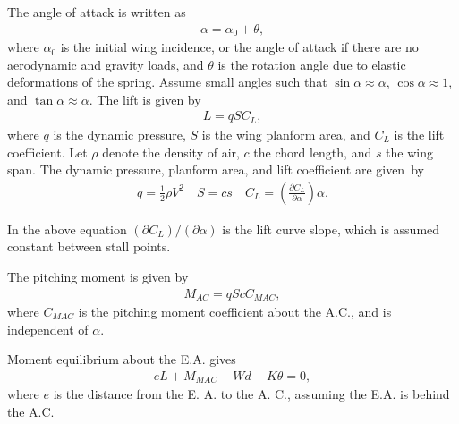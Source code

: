 \documentclass{AeroStructure-ERJohnson}
\begin{document}
The angle of attack is written\vspace*{-4pt} as
\begin{align}\label{eq12.1}
\alpha=\alpha_{0}+\theta,
\end{align}
where $\alpha_{0}$ is the initial wing incidence, or the angle of attack if there are no aerodynamic and gravity loads, and $\theta$ is the rotation angle due to elastic deformations of the spring. Assume small angles such that $\sin \alpha \approx \alpha$, $\cos \alpha \approx 1$, and $\tan \alpha \approx \alpha$. The lift is given\vspace*{-4pt} by
\begin{align}\label{eq12.2}
L=q S C_{L},
\end{align}
where $q$ is the dynamic pressure, $S$ is the wing planform area, and $C_{L}$ is the lift coefficient. Let $\rho$ denote the density of air, ${c}$ the chord length, and $s$ the wing span. The dynamic pressure, planform area, and lift coefficient are given~\vspace*{-4pt}by
\begin{align}\label{eq12.3}
q=\frac{1}{2} \rho V^{2} \quad S=c s \quad C_{L}=\left(\frac{\partial C_{L}}{\partial \alpha}\right) \alpha.
\end{align}
\vspace*{4pt}
\pagebreak

\noindent In the above equation $\left(\partial C_{L}\right) /(\partial \alpha)$ is the lift curve slope, which is assumed constant between stall points.

The pitching moment is given by
\begin{align}\label{eq12.4}
M_{A C}=q S c C_{\textit{MAC}},
\end{align}
where $C_{\textit{MAC}}$ is the pitching moment coefficient about the A.C., and is independent of $\alpha$.

Moment equilibrium about the E.A. gives
\begin{align}\label{eq12.5}
e L+M_{MAC}-W d-K \theta=0,
\end{align}
where $e$ is the distance from the E. A. to the A. C., assuming the E.A. is behind the A.C.
\end{document}
